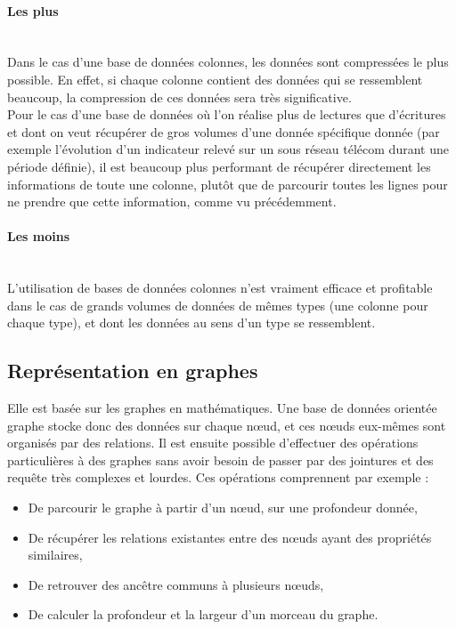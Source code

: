 \documentclass[a4paper,11pt]{article}
\begin{document}
		\paragraph{Les plus}~\\
		
		Dans le cas d’une base de données colonnes, les données sont compressées le plus possible. En effet, si chaque colonne contient des données qui se ressemblent beaucoup, la compression de ces données sera très significative.\\

		Pour le cas d’une base de données où l’on réalise plus de lectures que d’écritures et dont on veut récupérer de gros volumes d’une donnée spécifique donnée (par exemple l’évolution d’un indicateur relevé sur un sous réseau télécom durant une période définie), il est beaucoup plus performant de 
récupérer directement les informations de toute une colonne, plutôt que de parcourir toutes les lignes pour ne prendre que cette information, comme vu précédemment.

		\paragraph{Les moins}~\\
		
		L’utilisation de bases de données colonnes n’est vraiment efficace et profitable dans le cas de grands volumes de données de mêmes types (une colonne pour chaque type), et dont les données au sens d’un type se ressemblent.

		\subsection{Représentation en graphes}
		Elle est basée sur les graphes en mathématiques. Une base de données orientée graphe stocke donc des données sur chaque n\oe{}ud, et ces nœuds eux-mêmes sont organisés par des relations. Il est ensuite possible d'effectuer des opérations particulières à des graphes sans avoir besoin de passer par des jointures et des requête très complexes et lourdes. Ces opérations comprennent par exemple :\\

		\begin{itemize}
			\item De parcourir le graphe à partir d'un n\oe{}ud, sur une profondeur donnée,
			\item De récupérer les relations existantes entre des nœuds ayant des propriétés similaires,
			\item De retrouver des \og{}ancêtre\fg{} communs à plusieurs n\oe{}uds,
			\item De calculer la profondeur et la largeur d'un morceau du graphe.
		\end{itemize}
\end{document}

